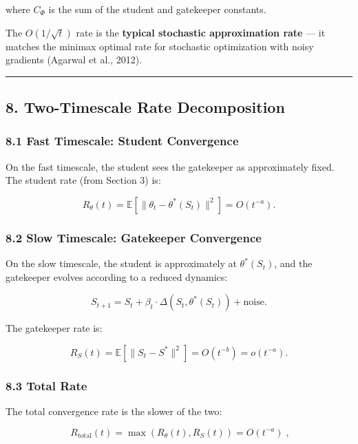 \documentclass[
  12pt,
]{article}
\begin{document}
where \(C_\Phi\) is the sum of the student and gatekeeper constants.

The \(O(1/\sqrt{t})\) rate is the \textbf{typical stochastic
approximation rate} --- it matches the minimax optimal rate for
stochastic optimization with noisy gradients (Agarwal et al., 2012).

\begin{center}\rule{0.5\linewidth}{0.5pt}\end{center}

\subsection{8. Two-Timescale Rate
Decomposition}\label{two-timescale-rate-decomposition}

\subsubsection{8.1 Fast Timescale: Student
Convergence}\label{fast-timescale-student-convergence}

On the fast timescale, the student sees the gatekeeper as approximately
fixed. The student rate (from Section 3) is:

\[R_\theta(t) = \mathbb{E}[\|\theta_t - \theta^*(S_t)\|^2] = O(t^{-a}).\]

\subsubsection{8.2 Slow Timescale: Gatekeeper
Convergence}\label{slow-timescale-gatekeeper-convergence}

On the slow timescale, the student is approximately at
\(\theta^*(S_t)\), and the gatekeeper evolves according to a reduced
dynamics:

\[S_{t+1} = S_t + \beta_t \cdot \Delta(S_t, \theta^*(S_t)) + \text{noise}.\]

The gatekeeper rate is:

\[R_S(t) = \mathbb{E}[\|S_t - S^*\|^2] = O(t^{-b}) = o(t^{-a}).\]

\subsubsection{8.3 Total Rate}\label{total-rate}

The total convergence rate is the slower of the two:

\[\boxed{\;R_{\text{total}}(t) = \max(R_\theta(t), R_S(t)) = O(t^{-a})\;},\]
\end{document}
